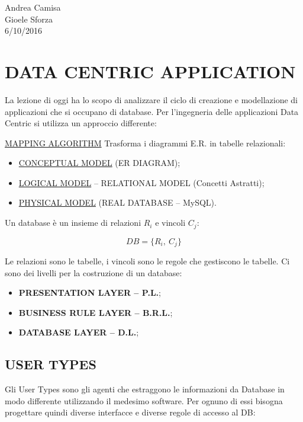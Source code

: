 \begin{flushright}Andrea Camisa\\Gioele Sforza\\6/10/2016\end{flushright}

\section{DATA CENTRIC APPLICATION}

La lezione di oggi ha lo scopo di analizzare il ciclo di creazione e modellazione di applicazioni che si occupano di database. Per l’ingegneria delle applicazioni Data Centric si utilizza un approccio differente: 

\underline{MAPPING ALGORITHM} Trasforma i diagrammi E.R. in tabelle relazionali:

\begin{itemize}

\item{\underline{CONCEPTUAL MODEL}} (ER DIAGRAM);
\item{\underline{LOGICAL MODEL}} – RELATIONAL MODEL (Concetti Astratti);   
\item{\underline{PHYSICAL MODEL}} (REAL DATABASE – MySQL).

\end{itemize}

Un database è un insieme di relazioni $R_i$ e vincoli $C_j$:

\[
	DB = \{R_i,\ C_j\}
\]

Le relazioni sono le tabelle, i vincoli sono le regole che gestiscono le tabelle. Ci sono dei livelli per la costruzione di un database: 

\begin{itemize}

\item{\textbf{PRESENTATION LAYER – P.L.}};
\item{\textbf{BUSINESS RULE LAYER – B.R.L.}};
\item{\textbf{DATABASE LAYER – D.L.}};

\end{itemize}

\subsection{USER TYPES}

Gli User Types sono gli agenti che estraggono le informazioni da Database in modo differente utilizzando il medesimo software. Per ognuno di essi bisogna progettare quindi diverse interfacce e diverse regole di accesso al DB:

